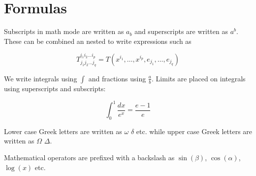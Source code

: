 
\clearpage

\section{Formulas}
\label{sec:Formulas}

Subscripts in math mode are written as $a_b$ and superscripts are written as $a^b$. These can be combined an nested to write expressions such as

\begin{equation}
    T^{i_1 i_2 \dots i_p}_{j_1 j_2 \dots j_q} = T(x^{i_1},\dots,x^{i_p},e_{j_1},\dots,e_{j_q})
    \label{a complicated formula 1}
\end{equation}

We write integrals using $\int$ and fractions using $\frac{a}{b}$. Limits are placed on integrals using superscripts and subscripts:

\begin{equation}
    \int_0^1 \frac{dx}{e^x} =  \frac{e-1}{e}
\end{equation}

Lower case Greek letters are written as $\omega$ $\delta$ etc. while upper case Greek letters are written as $\Omega$ $\Delta$.

Mathematical operators are prefixed with a backslash as $\sin(\beta)$, $\cos(\alpha)$, $\log(x)$ etc.

